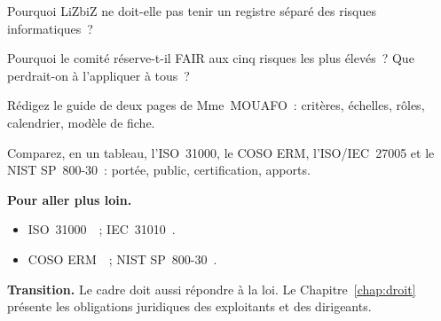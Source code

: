 \begin{boxexo}[title={\ding{45}\quad Exercice~4.7. Un registre \niveaumoyen}]
Pourquoi LiZbiZ ne doit-elle pas tenir un registre séparé des risques
informatiques~?
\end{boxexo}

\begin{boxexo}[title={\ding{45}\quad Exercice~4.8. Proportionner \niveaumoyen}]
Pourquoi le comité réserve-t-il FAIR aux cinq risques les plus élevés~?
Que perdrait-on à l'appliquer à tous~?
\end{boxexo}

\begin{boxexo}[title={\ding{45}\quad Exercice~4.9. Le guide \niveauexpert}]
Rédigez le guide de deux pages de Mme~MOUAFO~: critères, échelles, rôles,
calendrier, modèle de fiche.
\end{boxexo}

\begin{boxexo}[title={\ding{45}\quad Exercice~4.10. Comparer \niveauexpert}]
Comparez, en un tableau, l'ISO~31000, le COSO ERM, l'ISO/IEC~27005 et le
NIST SP~800-30~: portée, public, certification, apports.
\end{boxexo}

\bigskip

\begin{boxinfo}
\textbf{Pour aller plus loin.}
\begin{itemize}
    \item ISO~31000~\cite{iso31000_2018}~; IEC~31010~\cite{iec31010}.
    \item COSO ERM~\cite{coso2017erm}~; NIST SP~800-30~\cite{nist80030}.
\end{itemize}
\end{boxinfo}

\begin{boxinfo}
\textbf{Transition.} Le cadre doit aussi répondre à la loi. Le
Chapitre~\ref{chap:droit} présente les obligations juridiques des
exploitants et des dirigeants.
\end{boxinfo}
